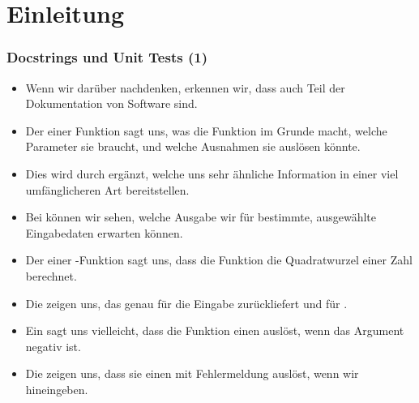 \documentclass[aspectratio=169,mathserif,notheorems]{beamer}%
\subtitle{36.~Zwischenspiel: Doctests}%
\begin{document}
%
%
\startPresentation%
%
\section{Einleitung}%
\begin{frame}[t]%
\frametitle{Docstrings und Unit Tests (1)}%
\begin{itemize}%
%
%
\item<2-> Wenn wir darüber nachdenken, erkennen wir, dass  auch Teil der Dokumentation von Software sind.%
%
\item<3-> Der  einer Funktion sagt uns, was die Funktion im Grunde macht, welche Parameter sie braucht, und welche Ausnahmen sie auslösen könnte.%
%
\item<4-> Dies wird durch  ergänzt, welche uns sehr ähnliche Information in einer viel umfänglicheren Art bereitstellen.%
%
\item<5-> Bei  können wir sehen, welche Ausgabe wir für bestimmte, ausgewählte Eingabedaten erwarten können.%
%
\item<6-> Der  einer -Funktion sagt uns, dass die Funktion die Quadratwurzel einer Zahl berechnet.%
%
\item<7-> Die  zeigen uns, das  genau  für die Eingabe  zurückliefert und  für .%
%
\item<8-> Ein   sagt uns vielleicht, dass die Funktion einen  auslöst, wenn das Argument negativ ist.%
%
\item<9-> Die  zeigen uns, dass sie einen  mit Fehlermeldung \emph{} auslöst, wenn wir  hineingeben.%
\end{itemize}%
\end{frame}%
%
\end{document}
